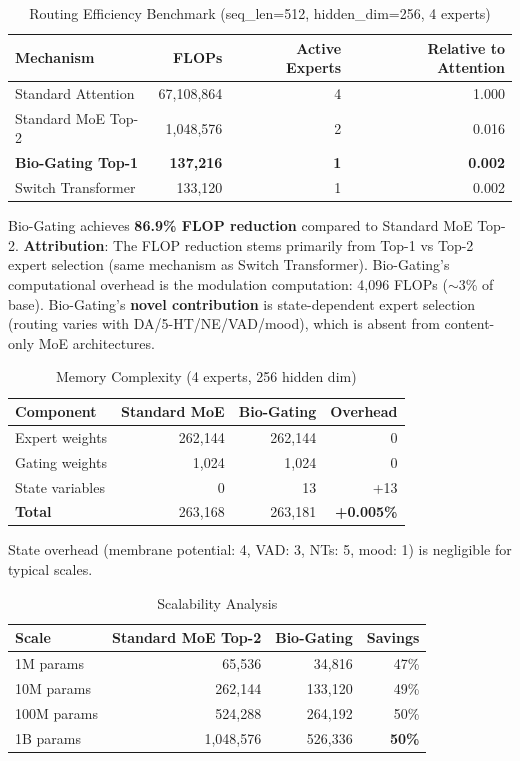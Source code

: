 \documentclass[preprint,12pt]{elsarticle}
\begin{document}
\begin{table}[htbp]
\centering
\caption{Routing Efficiency Benchmark (seq\_len=512, hidden\_dim=256, 4 experts)}
\label{tab:flop}
\begin{tabular}{lrrr}
\toprule
\textbf{Mechanism} & \textbf{FLOPs} & \textbf{Active Experts} & \textbf{Relative to Attention} \\
\midrule
Standard Attention & 67,108,864 & 4 & 1.000 \\
Standard MoE Top-2 & 1,048,576 & 2 & 0.016 \\
\textbf{Bio-Gating Top-1} & \textbf{137,216} & \textbf{1} & \textbf{0.002} \\
Switch Transformer & 133,120 & 1 & 0.002 \\
\bottomrule
\end{tabular}
\end{table}

Bio-Gating achieves \textbf{86.9\% FLOP reduction} compared to Standard MoE Top-2. \textbf{Attribution}: The FLOP reduction stems primarily from Top-1 vs Top-2 expert selection (same mechanism as Switch Transformer). Bio-Gating's computational overhead is the modulation computation: 4,096 FLOPs ($\sim$3\% of base). Bio-Gating's \textbf{novel contribution} is state-dependent expert selection (routing varies with DA/5-HT/NE/VAD/mood), which is absent from content-only MoE architectures.

\begin{table}[htbp]
\centering
\caption{Memory Complexity (4 experts, 256 hidden dim)}
\label{tab:memory}
\begin{tabular}{lrrr}
\toprule
\textbf{Component} & \textbf{Standard MoE} & \textbf{Bio-Gating} & \textbf{Overhead} \\
\midrule
Expert weights & 262,144 & 262,144 & 0 \\
Gating weights & 1,024 & 1,024 & 0 \\
State variables & 0 & 13 & +13 \\
\textbf{Total} & 263,168 & 263,181 & \textbf{+0.005\%} \\
\bottomrule
\end{tabular}
\end{table}

State overhead (membrane potential: 4, VAD: 3, NTs: 5, mood: 1) is negligible for typical scales.

\begin{table}[htbp]
\centering
\caption{Scalability Analysis}
\label{tab:scale}
\begin{tabular}{lrrr}
\toprule
\textbf{Scale} & \textbf{Standard MoE Top-2} & \textbf{Bio-Gating} & \textbf{Savings} \\
\midrule
1M params & 65,536 & 34,816 & 47\% \\
10M params & 262,144 & 133,120 & 49\% \\
100M params & 524,288 & 264,192 & 50\% \\
1B params & 1,048,576 & 526,336 & \textbf{50\%} \\
\bottomrule
\end{tabular}
\end{table}
\end{document}
